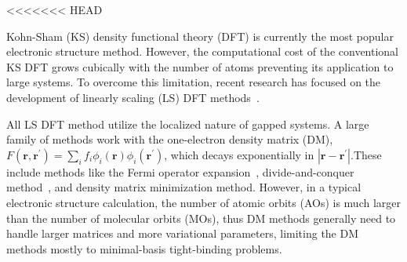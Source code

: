\documentclass[aps,prl,twocolumn,reprint,amsmath,amssymb]{revtex4-1}
\begin{document}
<<<<<<< HEAD

Kohn-Sham (KS) density functional theory (DFT) is currently the most popular electronic structure method. However, the computational cost of the conventional KS DFT grows cubically with the number of atoms preventing its application to large systems. To overcome this limitation, recent research has focused on the development of linearly scaling (LS) DFT methods~\cite{goedecker1999linear,bowler2012methods}. 

All LS DFT method utilize the localized nature of gapped systems. A large family of methods work with the one-electron density matrix (DM)\cite{li1993density,lee1996linear,li2003density,vandevondele2012linear}, $F(\mathbf{r},\mathbf{r}^{'})=\sum_i f_i \phi_i(\mathbf{r}) \phi_i(\mathbf{r}^{'})$, which decays exponentially in $|\mathbf{r}-\mathbf{r}^{'}|$.These include methods like the Fermi operator expansion~\cite{goedecker1994efficient,goedecker1995tight}, divide-and-conquer method~\cite{yang1991direct,yang1991local}, and density matrix minimization method\cite{li1993density}. However, in a typical electronic structure calculation, the number of atomic orbits (AOs) is much larger than the number of molecular orbits (MOs), thus DM methods generally need to handle larger matrices and more variational parameters, limiting the DM methods mostly to minimal-basis tight-binding problems. 

 
\end{document}

